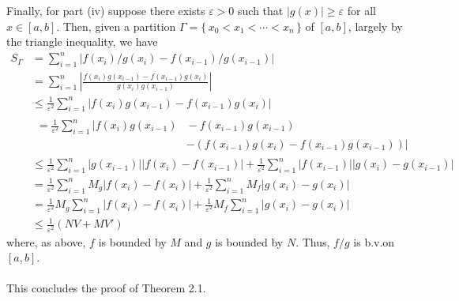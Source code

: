 \begin{solution}
  Finally, for part (iv) suppose there exists $\varepsilon>0$ such that
  $|g(x)|\geq\varepsilon$ for all $x\in[a,b]$. Then, given a partition
  $\Gamma=\{\,x_0<x_1<\cdots<x_n\,\}$ of $[a,b]$, largely by the triangle
  inequality, we have
  \begin{align*}
    S_\Gamma
    &=\sum_{i=1}^n |f(x_i)/g(x_i)-f(x_{i-1})/g(x_{i-1})|\\
    &=\sum_{i=1}^n\left|\frac{f(x_i)g(x_{i-1})-
      f(x_{i-1})g(x_i)}{g(x_i)g(x_{i-1})}\right|\\
    &\leq\frac{1}{\varepsilon^2}\sum_{i=1}^n|f(x_i)g(x_{i-1})-f(x_{i-1})g(x_i)|\\
    &
      \begin{aligned}
        =\frac{1}{\varepsilon^2}\sum_{i=1}^n |f(x_i)g(x_{i-1}){}&{}-f(x_{i-1})g(x_{i-1})\\
        &-(f(x_{i-1})g(x_i)-f(x_{i-1})g(x_{i-1}))|
      \end{aligned}\\
    &\leq
      \frac{1}{\varepsilon^2}\sum_{i=1}^n|g(x_{i-1})||f(x_i)-f(x_{i-1})|
      +\frac{1}{\varepsilon^2}\sum_{i=1}^n|f(x_{i-1})||g(x_i)-g(x_{i-1})|\\
    &=\frac{1}{\varepsilon^2}\sum_{i=1}^nM_g|f(x_i)-f(x_{i})|
      +\frac{1}{\varepsilon^2}\sum_{i=1}^nM_f|g(x_i)-g(x_i)|\\
    &=\frac{1}{\varepsilon^2}M_g\sum_{i=1}^n|f(x_i)-f(x_{i})|
      +\frac{1}{\varepsilon^2}M_f\sum_{i=1}^n|g(x_i)-g(x_i)|\\
    &\leq\frac{1}{\varepsilon^2}(NV+MV')
  \end{align*}
  where, as above, $f$ is bounded by $M$ and $g$ is bounded by $N$. Thus,
  $f/g$ is b.v.\@ on $[a,b]$.
  \\\\
  This concludes the proof of Theorem 2.1.
\end{solution}

